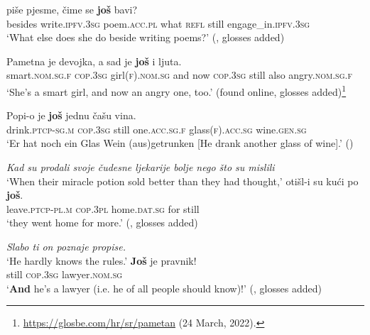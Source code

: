 \begin{exe}
	\ex
	 piše pjesme, čime se \textbf{još} bavi?\\
	besides write.\textsc{ipfv}.3\textsc{sg} poem.\textsc{acc}.\textsc{pl} what \textsc{refl} still engage\_in.\textsc{ipfv}.3\textsc{sg}\\
	\glt \lq What else does she do beside writing poems?\rq{ }(\cite[246]{Alexander2006}, glosses added)
	
	\ex\label{exappendixBCMSAdditive2}
	 \gll Pametna je devojka, a sad je \textbf{još} i ljuta.\\
	smart.\textsc{nom}.\textsc{sg}.\textsc{f} \textsc{cop}.3\textsc{sg} girl(\textsc{f}).\textsc{nom}.\textsc{sg} and now \textsc{cop}.3\textsc{sg} still also angry.\textsc{nom}.\textsc{sg}.\textsc{f}\\
	\glt \lq She's a smart girl, and now an angry one, too.\rq{ }(found online, glosses added)\footnote{\url{https://glosbe.com/hr/sr/pametan} (24 March, 2022).}
	
\ex
	\gll Popi-o je \textbf{još} jednu čašu vina.\\
	drink.\textsc{ptcp}-\textsc{sg}.\textsc{m} \textsc{cop}.3\textsc{sg} still one.\textsc{acc}.\textsc{sg}.\textsc{f} glass(\textsc{f}).\textsc{acc}.\textsc{sg} wine.\textsc{gen}.\textsc{sg}\\
	\glt \lq Er hat noch ein Glas Wein (aus)getrunken [He drank another glass of wine].’ (\cite[32]{Buchholz1991})

	\ex\label{exappendixBCMSAdditive5}
	\textit{Kad su prodali svoje čudesne ljekarije bolje nego što su mislili}\\
	\lq When their miracle potion sold better than they had thought,\rq{}
	\gll otišl-i su kući po \textbf{još}.\\
	leave.\textsc{ptcp}-\textsc{pl}.\textsc{m} \textsc{cop}.3\textsc{pl} home.\textsc{dat}.\textsc{sg} for still\\
	\glt \lq they went home for more.\rq{ }(\cite[s.v. \textit{još}]{HJP}, glosses added)
	
	\ex\label{exappendixBCMSAdditive6}
	\begin{xlist}
     \textit{Slabo ti on poznaje propise.}\\
	\lq He hardly knows the rules.\rq{}
	\gll \textbf{Još} je pravnik!\\
	still \textsc{cop}.3\textsc{sg} lawyer.\textsc{nom}.\textsc{sg}\\
	\glt \lq \textbf{And} he's a lawyer (i.e. he of all people should know)!\rq{ }(\cite[s.v. \textit{još}]{HJP}, glosses added)		
    \end{xlist}
\end{exe}


